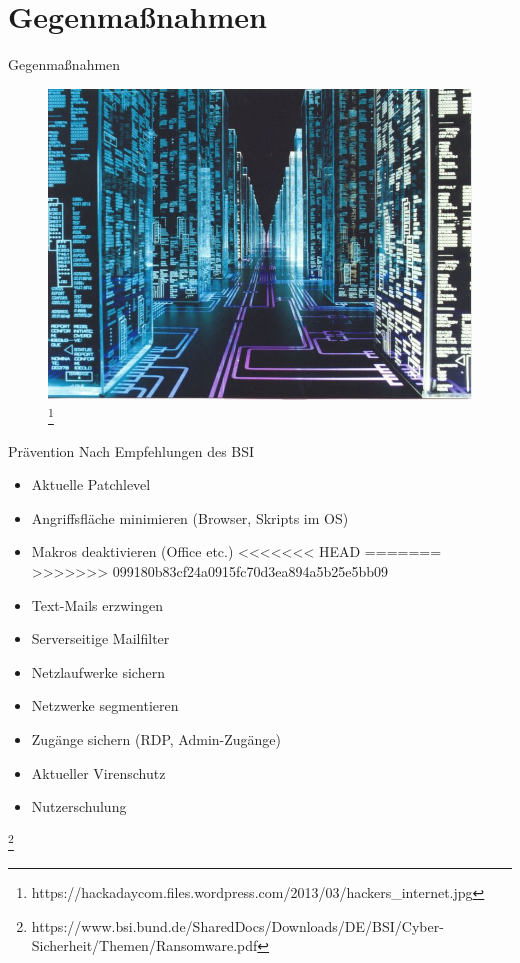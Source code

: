 \documentclass[10pt]{beamer}
\begin{document}
\section{Gegenmaßnahmen}
\begin{frame}{Gegenmaßnahmen}
	\begin{figure}[p]
		\centering
		\includegraphics[scale=0.3]{hackers_internet.jpg}
		\let\thefootnote\relax\footnote{https://hackadaycom.files.wordpress.com/2013/03/hackers\_internet.jpg}
	\end{figure}
\end{frame}
\begin{frame}{Prävention}
	Nach Empfehlungen des BSI
	\begin{itemize}
		\item Aktuelle Patchlevel
		\item Angriffsfläche minimieren (Browser, Skripts im OS)
		\item Makros deaktivieren (Office etc.)
<<<<<<< HEAD
=======
>>>>>>> 099180b83cf24a0915fc70d3ea894a5b25e5bb09
		\item Text-Mails erzwingen
		\item Serverseitige Mailfilter
		\item Netzlaufwerke sichern
		\item Netzwerke segmentieren
		\item Zugänge sichern (RDP, Admin-Zugänge)
		\item Aktueller Virenschutz 
		\item Nutzerschulung
	\end{itemize}
	\let\thefootnote\relax\footnote{https://www.bsi.bund.de/SharedDocs/Downloads/DE/BSI/Cyber-Sicherheit/Themen/Ransomware.pdf}
\end{frame}
\end{document}
